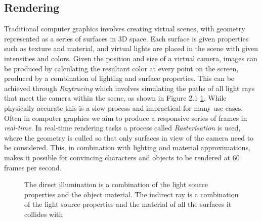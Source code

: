 \documentclass[ %
                    author={Gavin Parker},
                supervisor={Dr. Neill Campbell},
                    degree={MEng},
                     title={Deep Siamese Networks for Illumination Estimation from Stereo Images},
                  subtitle={},
                      type={Research},
                      year={2018} ]{dissertation}
\begin{document}
\subsection{Rendering}
Traditional computer graphics involves creating virtual scenes, with geometry represented as a series of surfaces in 3D space. Each surface is given properties such as texture and material, and virtual lights are placed in the scene with given intensities and colors. Given the position and size of a virtual camera, images can be produced by calculating the resultant color at every point on the screen, produced by a combination of lighting and surface properties. This can be achieved through \textit{Raytracing} which involves simulating the paths of all light rays that meet the camera within the scene, as shown in Figure 2.1 \ref{raytracing}. While physically accurate this is a slow process and impractical for many use cases. Often in computer graphics we aim to produce a responsive series of frames in \textit{real-time}. In real-time rendering tasks a process called \textit{Rasterisation} is used, where the geometry is culled so that only surfaces in view of the camera need to be considered. This, in combination with lighting and material approximations, makes it possible for convincing characters and objects to be rendered at 60 frames per second.
\newpage
\begin{center}
\begin{figure}[H]
\centering
{}
\label{raytracing}
\caption{The direct illumination is a combination of the light source properties and the object material. The indirect ray is a combination of the light source properties and the material of all the surfaces it collides with}
\end{figure}
\end{center}
\end{document}
